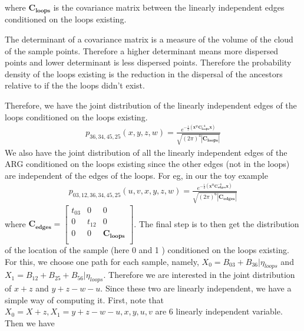 where $\mathbf{C_{loops}}$ is the covariance matrix between the linearly independent edges conditioned on the loops existing. 
\begin{note}
    The determinant of a covariance matrix is a measure of the volume of the cloud of the sample points. Therefore a higher determinant means more dispersed points and lower determinant is less dispersed points. Therefore the probability density of the loops existing is the reduction in the dispersal of the ancestors relative to if the the loops didn't exist. 
\end{note}
Therefore, we have the joint distribution of the linearly independent edges of the loops conditioned on the loops existing. 
\begin{eqnarray*}
    p_{36,34,45,25}(x,y,z,w) = \frac{e^{ -\frac{1}{2}( \mathbf{x^TC_{loops}^{-1}x}  ) }}{\sqrt{ (2\pi)^4 |\mathbf{C_{loops}}| }}
\end{eqnarray*}
We also have the joint distribution of all the linearly independent edges of the ARG conditioned on the loops existing since the other edges (not in the loops) are independent of the edges of the loops. For eg, in our the toy example
\begin{eqnarray*}
    p_{03,12,36,34,45,25}(u,v,x,y,z,w) =  \frac{e^{ -\frac{1}{2}( \mathbf{x^TC_{edges}^{-1}x}  ) }}{\sqrt{ (2\pi)^6 |\mathbf{C_{edges}}| }}
\end{eqnarray*}
where $\mathbf{C_{edges}} = \begin{bmatrix}
    t_{03} & 0 & 0\\
    0 & t_{12} & 0 \\ 
    0 & 0 & \mathbf{C_{loops}}\\
\end{bmatrix}$. 
The final step is to then get the distribution of the location of the sample (here 0 and 1 ) conditioned on the loops existing. For this, we choose one path for each sample, namely, $X_0 = B_{03} + B_{36} | \eta_{loops}$ and $X_1 = B_{12}+B_{25}+B_{56} | \eta_{loops}$. Therefore we are interested in the joint distribution of $x+z$ and $y+z-w-u$. Since these two are linearly independent, we have a simple way of computing it. First, note that $X_0 = X+z,  X_1 = y+z-w-u, x, y, u, v$ are 6 linearly independent variable. Then we have 
